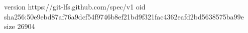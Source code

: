 version https://git-lfs.github.com/spec/v1
oid sha256:50e9ebd87af76a9dcf54f9746b8ef21bd9f321fac4362eafd2bd5638575ba99e
size 26904
